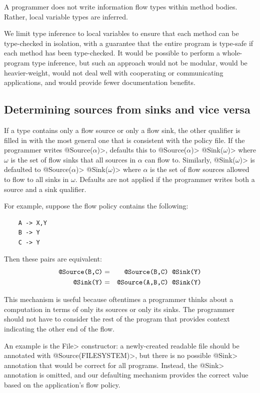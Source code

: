 A programmer does not write information flow types within method bodies.  Rather, local
variable types are inferred.

We limit type inference to local variables to ensure that
each method can be type-checked in isolation,
with a guarantee that the entire program is type-safe if each method has
been type-checked.  It would be possible to perform a whole-program type
inference, but such an approach would not be modular, would be
heavier-weight, would not deal well with cooperating or communicating
applications, and would provide fewer documentation benefits.  


\subsection{Determining sources from sinks and vice versa}
\label{sec:infer-from-flow-policy}

If a type contains only a flow source or only a flow sink, the other qualifier is
filled in with the most general one that is consistent
with the policy file.
%
If the programmer writes 
\<@Source($\alpha$)>, \theFlowChecker defaults this to
\<@Source($\alpha$)> \<@Sink($\omega$)> where $\omega$ is the
set of flow sinks that all sources in $\alpha$ can flow to.
%
Similarly,
\<@Sink($\omega$)> is defaulted to
\<@Source($\alpha$)> \<@Sink($\omega$)> where $\alpha$ is the
set of flow sources allowed to flow to all sinks in $\omega$.
%
Defaults are not applied if the programmer writes both a source and a
sink qualifier.

For example, suppose the flow policy contains the following:

\begin{Verbatim}
    A -> X,Y
    B -> Y
    C -> Y
\end{Verbatim}
  
\noindent 
Then these pairs are equivalent:
\begin{eqnarray*}
  \mbox{\<@Source({B,C})>} & = & \mbox{\<@Source({B,C}) @Sink(Y)>} \\
  \mbox{\<@Sink(Y)>}       & = & \mbox{\<@Source({A,B,C}) @Sink(Y)>}
\end{eqnarray*}

This mechanism is useful because oftentimes a programmer thinks about a
computation in terms of only its sources or only its sinks.
The programmer should not have to consider the rest of the program
that provides context indicating the other end of the flow.


An example is the \<File> constructor:
a newly-created readable file should be annotated with
\<@Source(FILESYSTEM)>, but there is no possible \<@Sink> annotation
that would be correct for all programs.
Instead, the \<@Sink> annotation is omitted, and
our defaulting mechanism provides the correct value
based on the application's flow policy.



